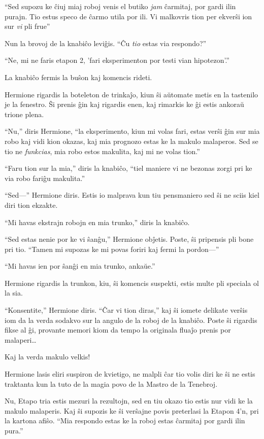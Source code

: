 ``Sed supozu ke ĉiuj miaj roboj venis el butiko \emph{jam} ĉarmitaj,
por gardi ilin purajn. Tio estus speco de ĉarmo utila por ili. Vi
malkovris tion per ekverŝi ion sur \emph{vi} pli frue''

Nun la brovoj de la knabiĉo leviĝis. ``Ĉu \emph{tio} estas via
respondo?''

``Ne, mi ne faris etapon 2, 'fari eksperimenton por testi vian
hipotezon'.''

La knabiĉo fermis la buŝon kaj komencis rideti.

Hermione rigardis la boteleton de trinkaĵo, kiun ŝi aŭtomate metis en
la tastenilo je la fenestro. Ŝi prenis ĝin kaj rigardis enen, kaj
rimarkis ke ĝi estis ankoraŭ trione plena.

``Nu,'' diris Hermione, ``la eksperimento, kiun mi volas fari, estas
verŝi ĝin sur mia robo kaj vidi kion okazas, kaj mia prognozo estas
ke la makulo malaperos. Sed se tio ne \emph{funkcias}, mia robo estos
makulita, kaj mi ne volas tion.''

``Faru tion sur la mia,'' diris la knabiĉo, ``tiel maniere vi ne
bezonas zorgi pri ke via robo fariĝu makulita.''

``Sed—'' Hermione diris. Estis io malprava kun tiu pensmaniero sed ŝi
ne sciis kiel diri tion ekzakte.

``Mi havas ekstrajn robojn en mia trunko,'' diris la knabiĉo.

``Sed estas nenie por ke vi ŝanĝu,'' Hermione obĵetis. Poste, ŝi
pripensis pli bone pri tio. ``Tamen mi supozas ke mi povas foriri kaj
fermi la pordon—''

``Mi havas ien por ŝanĝi en mia trunko, ankaŭe.''

Hermione rigardis la trunkon, kiu, ŝi komencis suspekti, estis multe
pli speciala ol la sia.

``Konsentite,'' Hermione diris. ``Ĉar vi tion diras,'' kaj ŝi iomete
delikate verŝis iom da la verda sodakvo sur la angulo de la roboj de
la knabiĉo. Poste ŝi rigardis fikse al ĝi, provante memori kiom da tempo
la originala fluaĵo prenis por malaperi\ldots

Kaj la verda makulo velkis!

Hermione lasis eliri suspiron de kvietigo, ne malpli ĉar tio volis
diri ke ŝi ne estis traktanta kun la tuto de la magia povo de la
Mastro de la Tenebroj.

Nu, Etapo tria estis mezuri la rezultojn, sed en tiu okazo tio estis
nur vidi ke la makulo malaperis. Kaj ŝi supozis ke ŝi verŝajne povis
preterlasi la Etapon 4'n, pri la kartona afiŝo. ``Mia respondo estas
ke la roboj estas ĉarmitaj por gardi ilin pura.''

